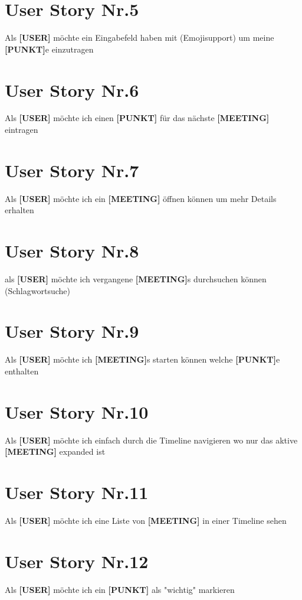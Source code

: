 \section{User Story Nr.5}


Als \textbf{[USER]} möchte ein Eingabefeld haben mit (Emojisupport) um meine \textbf{[PUNKT]}e einzutragen
\section{User Story Nr.6}


Als \textbf{[USER]} möchte ich einen \textbf{[PUNKT]} für das nächste \textbf{[MEETING]} eintragen
\section{User Story Nr.7}


Als \textbf{[USER]} möchte ich ein \textbf{[MEETING]} öffnen können um mehr Details erhalten
\section{User Story Nr.8}


als \textbf{[USER]} möchte ich vergangene \textbf{[MEETING]}s durchsuchen können (Schlagwortsuche)
\section{User Story Nr.9}


Als  \textbf{[USER]} möchte ich \textbf{[MEETING]}s starten können welche \textbf{[PUNKT]}e enthalten
\section{User Story Nr.10}


Als  \textbf{[USER]} möchte ich einfach durch die Timeline navigieren wo nur das aktive \textbf{[MEETING]} expanded ist
\section{User Story Nr.11}


Als \textbf{[USER]} möchte ich eine Liste von \textbf{[MEETING]} in einer Timeline sehen

\section{User Story Nr.12}

Als \textbf{[USER]} möchte ich ein  \textbf{[PUNKT]} als "wichtig" markieren